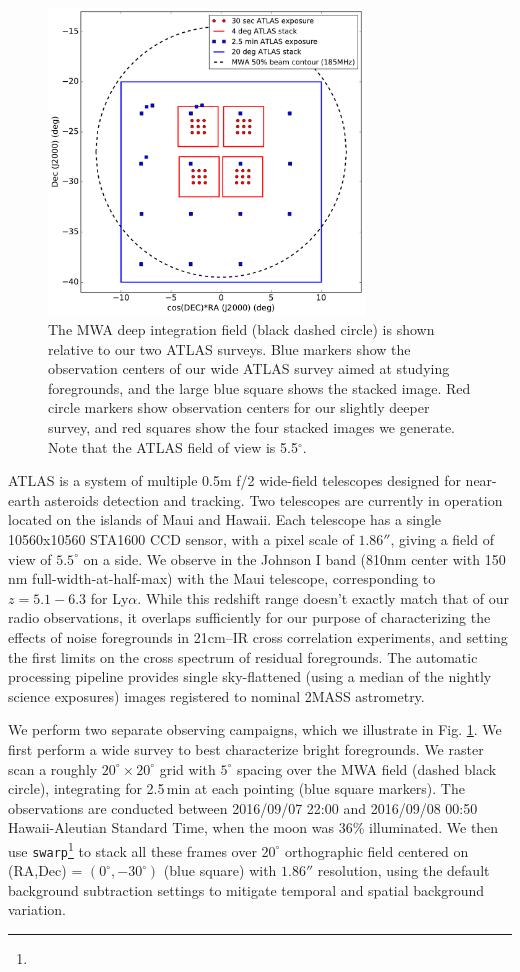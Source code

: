 \documentclass{emulateapj}
\begin{document}
\begin{figure}[h]
\centering
\includegraphics[width=3.3in]{images/survey_overview.pdf}
\caption{The MWA deep integration field (black dashed circle) is shown relative to our two ATLAS surveys. Blue markers show the observation centers of our wide ATLAS survey aimed at studying foregrounds, and the large blue square shows the stacked image. Red circle markers show observation centers for our slightly deeper survey, and red squares show the four stacked images we generate. Note that the ATLAS field of view is 5.5$^\circ$.}
\label{fig:surveyoverview}
\end{figure}


ATLAS is a system of multiple 0.5m f/2 wide-field telescopes \citep{tonry11} designed for near-earth asteroids detection and tracking. Two telescopes are currently in operation located on the islands of Maui and Hawaii.   Each telescope has a single 10560x10560 STA1600 CCD sensor, with a pixel scale of $1.86''$, giving a field of view of $5.5^\circ$ on a side.  We observe in the Johnson I band (810nm center with 150\,nm full-width-at-half-max) with the Maui telescope, corresponding to $z=5.1-6.3$ for Ly$\alpha$.  While this redshift range doesn't exactly match that of our radio observations, it overlaps sufficiently for our purpose of characterizing the effects of noise foregrounds in 21cm--IR cross correlation experiments, and setting the first limits on the cross spectrum of residual foregrounds. The automatic processing pipeline provides single sky-flattened (using a median of the nightly science exposures) images registered to nominal 2MASS astrometry.

We perform two separate observing campaigns, which we illustrate in Fig. \ref{fig:surveyoverview}. We first perform a wide survey to best characterize bright foregrounds. We raster scan a roughly $20^\circ\times20^\circ$ grid with $5^\circ$ spacing over the MWA field (dashed black circle), integrating for 2.5\,min at each pointing (blue square markers). The observations are conducted between 2016/09/07 22:00  and 2016/09/08 00:50 Hawaii-Aleutian Standard Time, when the moon was 36\% illuminated. We then use {\tt swarp}\footnote{} \citep{swarp} to stack all these frames over $20^\circ$ orthographic field centered on (RA,Dec) = $(0^\circ,-30^\circ)$ (blue square) with $1.86''$ resolution, using the default background subtraction settings to mitigate temporal and spatial background variation. 
\end{document}
